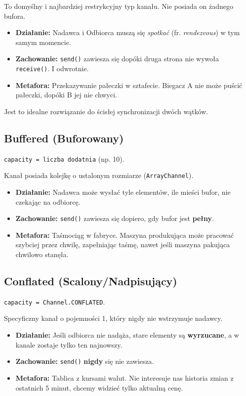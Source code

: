 To domyślny i najbardziej restrykcyjny typ kanału. Nie posiada on żadnego bufora.
\begin{itemize}
    \item \textbf{Działanie:} Nadawca i Odbiorca muszą się \textit{spotkać} (fr. \textit{rendezvous}) w tym samym momencie.
    \item \textbf{Zachowanie:} \texttt{send()} zawiesza się dopóki druga strona nie wywoła \texttt{receive()}. I odwrotnie.
    \item \textbf{Metafora:} Przekazywanie pałeczki w sztafecie. Biegacz A nie może puścić pałeczki, dopóki B jej nie chwyci.
\end{itemize}

Jest to idealne rozwiązanie do ścisłej synchronizacji dwóch wątków.

\subsection{Buffered (Buforowany)}
\texttt{capacity = liczba dodatnia} (np. 10).

Kanał posiada kolejkę o ustalonym rozmiarze (\texttt{ArrayChannel}).
\begin{itemize}
    \item \textbf{Działanie:} Nadawca może wysłać tyle elementów, ile mieści bufor, nie czekając na odbiorcę.
    \item \textbf{Zachowanie:} \texttt{send()} zawiesza się dopiero, gdy bufor jest \textbf{pełny}.
    \item \textbf{Metafora:} Taśmociąg w fabryce. Maszyna produkująca może pracować szybciej przez chwilę, zapełniając taśmę, nawet jeśli maszyna pakująca chwilowo stanęła.
\end{itemize}

\subsection{Conflated (Scalony/Nadpisujący)}
\texttt{capacity = Channel.CONFLATED}.

Specyficzny kanał o pojemności 1, który nigdy nie wstrzymuje nadawcy.
\begin{itemize}
    \item \textbf{Działanie:} Jeśli odbiorca nie nadąża, stare elementy są \textbf{wyrzucane}, a w kanale zostaje tylko ten najnowszy.
    \item \textbf{Zachowanie:} \texttt{send()} \textbf{nigdy} się nie zawiesza.
    \item \textbf{Metafora:} Tablica z kursami walut. Nie interesuje nas historia zmian z ostatnich 5 minut, chcemy widzieć tylko aktualną cenę.
\end{itemize}


